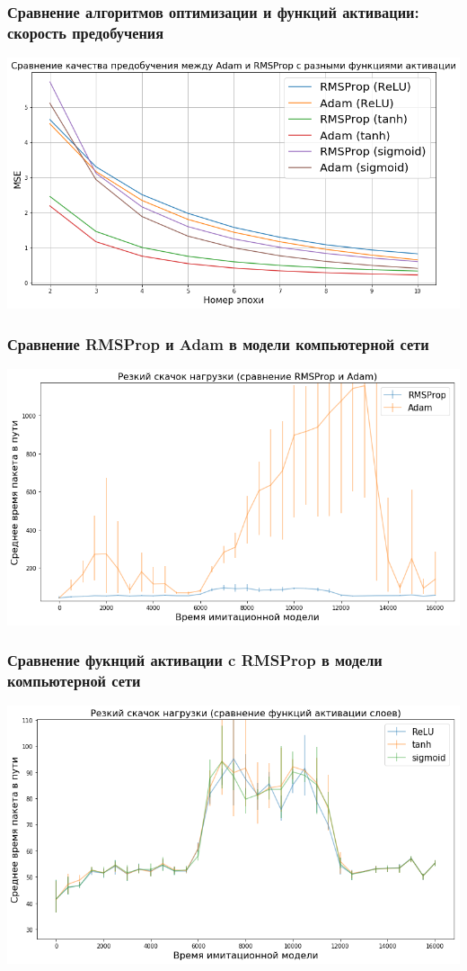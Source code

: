\documentclass{beamer}
\begin{document}
\begin{frame}
\begin{columns}
\begin{column}{0.5\textwidth}
    \end{column}
  \end{columns}
\end{frame}

\begin{frame}
  \frametitle{Сравнение алгоритмов оптимизации и функций активации: скорость предобучения}
  \includegraphics[width=\textwidth]{experiment-optimizers-pretrain-adam-vs-rmsprop}
\end{frame}

\begin{frame}
  \frametitle{Сравнение RMSProp и Adam в модели компьютерной сети}
  \includegraphics[width=\textwidth]{experiment-adam-failure}
\end{frame}

\begin{frame}
  \frametitle{Сравнение фукнций активации c RMSProp в модели компьютерной сети}
  \includegraphics[width=\textwidth]{experiment-activations-launch}
\end{frame}
\end{document}
